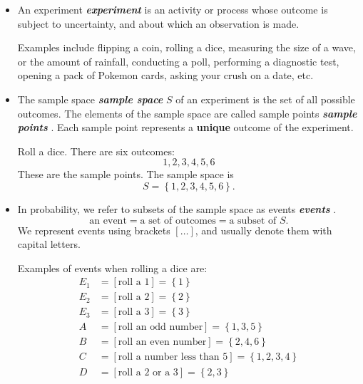 \documentclass[10pt]{article}
\theoremstyle{definition}
\newcommand{\1}[1]{\textbf{1}_{\left[#1\right]}} %
\DeclareRobustCommand{\demph}[1]{%
  \ifmmode
  {\color{Blue}#1}%
  \else
  {\color{Blue}\bfseries\slshape #1}%
  \fi
}
\begin{document}
\begin{itemize}
  \item An \demph{experiment} is an activity or process whose outcome is
  subject to uncertainty, and about which an observation is made.

  Examples include flipping a coin, rolling a dice, measuring the size of a
  wave, or the amount of rainfall, conducting a poll, performing a diagnostic
  test, opening a pack of Pokemon cards, asking your crush on a date, etc.

  \item The \demph{sample space} $S$ of an experiment is the set of all
  possible outcomes. The elements of the sample space are called \demph{sample
    points}. Each sample point represents a \textbf{unique} outcome of the
  experiment.

  Roll a dice. There are six outcomes:
  \begin{equation*}
    1,2,3,4,5,6
  \end{equation*}
  These are the sample points. The sample space is
  \begin{equation*}
    S=\left\{1,2,3,4,5,6\right\}.
  \end{equation*}

  \item In probability, we refer to subsets of the sample space as
  \demph{events}.
  \begin{equation*}
    \text{an event} = \text{a set of outcomes} = \text{a subset of $S$}.
  \end{equation*}
  We represent events using brackets $\left[ \ldots \right]$, and usually
  denote them with capital letters.

  Examples of events when rolling a dice are:
  \begin{equation*}
    \begin{aligned}
      E_{1}&=[\text{roll a 1}] = \left\{1\right\} \\
      E_{2}&=[\text{roll a 2}] = \left\{2\right\} \\
      E_{3}&=[\text{roll a 3}] = \left\{3\right\} \\
      A &= [\text{roll an odd number}] = \left\{1,3,5\right\} \\
      B &= [\text{roll an even number}] = \left\{2,4,6\right\} \\
      C &= [\text{roll a number less than 5}] = \left\{1,2,3,4\right\} \\
      D &= [\text{roll a 2 or a 3}] = \left\{2,3\right\} \\
    \end{aligned}
  \end{equation*}
  

\end{itemize}
\end{document}
